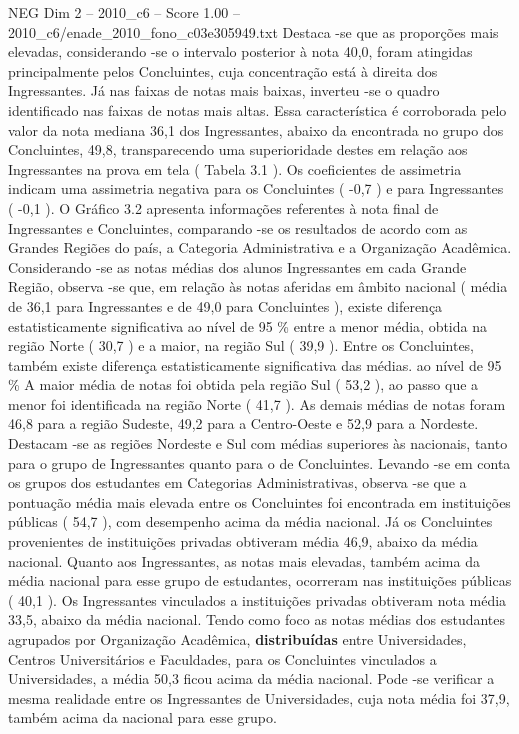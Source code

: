 \begin{textsample}{NEG Dim 2 – 2010\_c6 – Score 1.00 – 2010\_c6/enade\_2010\_fono\_c03e305949.txt}
Destaca -se que as proporções mais elevadas, considerando -se o intervalo posterior à nota 40,0, foram atingidas principalmente pelos Concluintes, cuja concentração está à direita dos Ingressantes.
Já nas faixas de notas mais baixas, inverteu -se o quadro identificado nas faixas de notas mais altas.
Essa característica é corroborada pelo valor da nota mediana 36,1 dos Ingressantes, abaixo da encontrada no grupo dos Concluintes, 49,8, transparecendo uma superioridade destes em relação aos Ingressantes na prova em tela ( Tabela 3.1 ).
Os coeficientes de assimetria indicam uma assimetria negativa para os Concluintes ( -0,7 ) e para Ingressantes ( -0,1 ).
O Gráfico 3.2 apresenta informações referentes à nota final de Ingressantes e Concluintes, comparando -se os resultados de acordo com as Grandes Regiões do país, a Categoria Administrativa e a Organização Acadêmica.
Considerando -se as notas médias dos alunos Ingressantes em cada Grande Região, observa -se que, em relação às notas aferidas em âmbito nacional ( média de 36,1 para Ingressantes e de 49,0 para Concluintes ), existe diferença estatisticamente significativa ao nível de 95 \% entre a menor média, obtida na região Norte ( 30,7 ) e a maior, na região Sul ( 39,9 ).
Entre os Concluintes, também existe diferença estatisticamente significativa das médias. ao nível de 95 \% A maior média de notas foi obtida pela região Sul ( 53,2 ), ao passo que a menor foi identificada na região Norte ( 41,7 ).
As demais médias de notas foram 46,8 para a região Sudeste, 49,2 para a Centro-Oeste e 52,9 para a Nordeste.
Destacam -se as regiões Nordeste e Sul com médias superiores às nacionais, tanto para o grupo de Ingressantes quanto para o de Concluintes.
Levando -se em conta os grupos dos estudantes em Categorias Administrativas, observa -se que a pontuação média mais elevada entre os Concluintes foi encontrada em instituições públicas ( 54,7 ), com desempenho acima da média nacional.
Já os Concluintes provenientes de instituições privadas obtiveram média 46,9, abaixo da média nacional.
Quanto aos Ingressantes, as notas mais elevadas, também acima da média nacional para esse grupo de estudantes, ocorreram nas instituições públicas ( 40,1 ).
Os Ingressantes vinculados a instituições privadas obtiveram nota média 33,5, abaixo da média nacional.
Tendo como foco as notas médias dos estudantes agrupados por Organização Acadêmica, \textbf{distribuídas} entre Universidades, Centros Universitários e Faculdades, para os Concluintes vinculados a Universidades, a média 50,3 ficou acima da média nacional.
Pode -se verificar a mesma realidade entre os Ingressantes de Universidades, cuja nota média foi 37,9, também acima da nacional para esse grupo.

\end{textsample}
